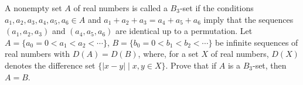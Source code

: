 A nonempty set $A$ of real numbers is called a $B_3$-set if the conditions $a_1, a_2, a_3, a_4, a_5, a_6 \in A$ and $a_1 + a_2 + a_3 = a_4 + a_5 + a_6$ imply that the sequences $(a_1, a_2, a_3)$ and $(a_4, a_5, a_6)$ are identical up to a permutation. Let $A = \{a_0 = 0 < a_1 < a_2 < \cdots\}$, $B = \{b_0 = 0 < b_1 < b_2 < \cdots\}$ be infinite sequences of real numbers with $D(A) = D(B)$, where, for a set $X$ of real numbers, $D(X)$ denotes the difference set $\{|x - y| \mid x, y \in X\}$. Prove that if $A$ is a $B_3$-set, then $A = B$.
